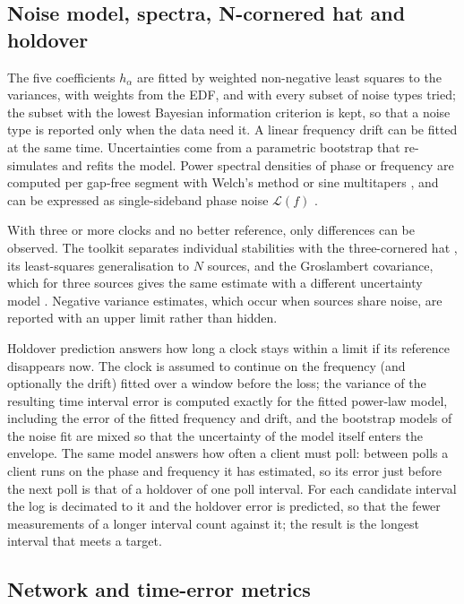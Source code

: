 \documentclass[11pt,a4paper]{article}
\begin{document}
\subsection{Noise model, spectra, N-cornered hat and holdover}

The five coefficients $h_\alpha$ are fitted by weighted non-negative least squares to the variances,
with weights from the EDF, and with every subset of noise types tried; the subset with the lowest
Bayesian information criterion \citep{schwarz1978} is kept, so that a noise type is reported only when
the data need it. A linear frequency drift can be fitted at the same time. Uncertainties come from a
parametric bootstrap that re-simulates and refits the model. Power spectral densities of phase or
frequency are computed per gap-free segment with Welch's method \citep{welch1967} or sine multitapers
\citep{thomson1982,riedel1995}, and can be expressed as single-sideband phase noise $\mathcal{L}(f)$
\citep{ieee1139}.

With three or more clocks and no better reference, only differences can be observed. The toolkit
separates individual stabilities with the three-cornered hat \citep{gray1974}, its least-squares
generalisation to $N$ sources, and the Groslambert covariance, which for three sources gives the same
estimate with a different uncertainty model \citep{vernotte2016}. Negative variance estimates, which
occur when sources share noise, are reported with an upper limit rather than hidden.

Holdover prediction answers how long a clock stays within a limit if its reference disappears now. The
clock is assumed to continue on the frequency (and optionally the drift) fitted over a window before the
loss; the variance of the resulting time interval error is computed exactly for the fitted power-law
model, including the error of the fitted frequency and drift, and the bootstrap models of the noise fit
are mixed so that the uncertainty of the model itself enters the envelope. The same model answers
how often a client must poll: between polls a client runs on the phase and frequency it has estimated,
so its error just before the next poll is that of a holdover of one poll interval. For each candidate
interval the log is decimated to it and the holdover error is predicted, so that the fewer measurements
of a longer interval count against it; the result is the longest interval that meets a target.

\subsection{Network and time-error metrics}
\end{document}
